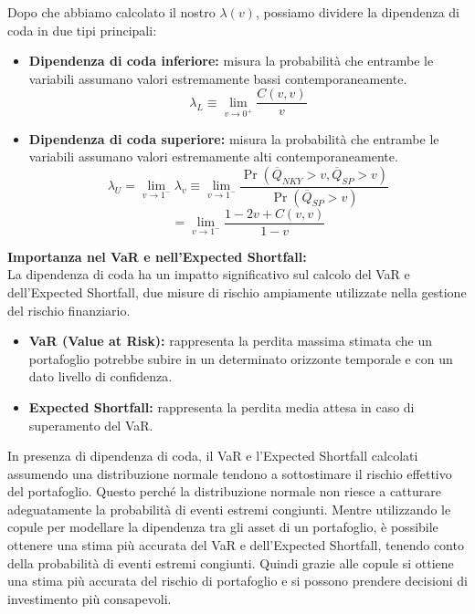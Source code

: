 \documentclass[a4paper,12pt]{article}
\begin{document}
\noindent Dopo che abbiamo calcolato il nostro $\lambda(v)$, possiamo dividere la dipendenza di coda in due tipi principali:
\begin{itemize}
	\item \textbf{Dipendenza di coda inferiore:} misura la probabilità che entrambe le variabili assumano valori estremamente bassi contemporaneamente.\\
	\[
	\lambda_L \equiv \lim_{v \to 0^+} \frac{C(v, v)}{v}
	\]
	\item \textbf{Dipendenza di coda superiore:} misura la probabilità che entrambe le variabili assumano valori estremamente alti contemporaneamente.\\
	\[
	\lambda_U = \lim_{v \to 1^-} \lambda_v \equiv \lim_{v \to 1^-} \frac{\Pr(\overline{Q}_{NKY} > v, \overline{Q}_{SP} > v)}{\Pr(\overline{Q}_{SP} > v)}
	\]
	\[
	= \lim_{v \to 1^-} \frac{1 - 2v + C(v, v)}{1 - v}
	\]
	\newline
	\newline
\end{itemize}

\noindent \textbf{Importanza nel VaR e nell'Expected Shortfall:}\\

\noindent La dipendenza di coda ha un impatto significativo sul calcolo del VaR e dell'Expected Shortfall, due misure di rischio ampiamente utilizzate nella gestione del rischio finanziario.

\begin{itemize}
	\item \textbf{VaR (Value at Risk):} rappresenta la perdita massima stimata che un portafoglio potrebbe subire in un determinato orizzonte temporale e con un dato livello di confidenza.
	\item \textbf{Expected Shortfall:} rappresenta la perdita media attesa in caso di superamento del VaR.
\end{itemize}

\noindent In presenza di dipendenza di coda, il VaR e l'Expected Shortfall calcolati assumendo una distribuzione normale tendono a sottostimare il rischio effettivo del portafoglio. Questo perché la distribuzione normale non riesce a catturare adeguatamente la probabilità di eventi estremi congiunti. Mentre utilizzando le copule per modellare la dipendenza tra gli asset di un portafoglio, è possibile ottenere una stima più accurata del VaR e dell'Expected Shortfall, tenendo conto della probabilità di eventi estremi congiunti. Quindi grazie alle copule si ottiene una stima più accurata del rischio di portafoglio e si possono prendere decisioni di investimento più consapevoli.
\newline
\end{document}
